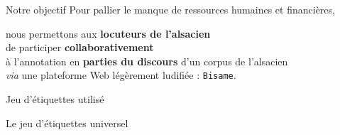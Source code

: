 \documentclass[french]{beamer}
\newcommand{\tool}[1]{\texttt{#1}\xspace}
\begin{document}
\begin{frame}{Notre objectif}
  Pour pallier le manque de ressources humaines et financières, 
  \begin{center}
    nous permettons aux \textbf{locuteurs de l'alsacien} \\ de participer \textbf{collaborativement} \\ à l'annotation en \textbf{parties du discours} d'un corpus de l'alsacien \\ \textit{via} une plateforme Web légèrement ludifiée : \tool{Bisame}.
  \end{center}
\end{frame}


\begin{frame}{Jeu d'étiquettes utilisé}
  \begin{table}[!ht]
    \centering
  \end{table}
  \centering
  Le jeu d'étiquettes universel \footnotemark[1]
   
\end{frame}
\end{document}
